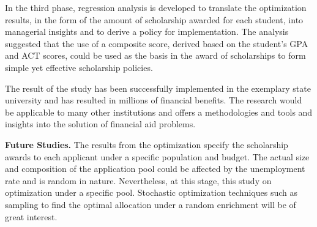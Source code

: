 \documentclass[12pt,english]{report}
\begin{document}
In the third phase, regression analysis is developed to translate the optimization results, in the form of the  amount of scholarship awarded for each student, into managerial insights and to derive a policy for implementation.  The analysis suggested that the use of a composite score, derived based on the student's GPA and ACT scores, could be used as the basis in the award of scholarships to form simple yet effective scholarship policies.

The result of the study has been successfully implemented in the exemplary state university and has resulted in millions of financial benefits.  The research would be applicable to many other institutions and offers a methodologies and tools and insights into the solution of financial aid problems. 

\noindent \textbf{Future Studies.}
The results from the optimization specify the scholarship awards to each applicant under a specific population and budget.  The actual size and composition of the application pool could be affected by the unemployment rate and is random in nature.  Nevertheless, at this stage, this study on optimization under a specific pool.  Stochastic optimization techniques such as sampling  to find the optimal allocation under a random enrichment will be of great interest. 

\end{document}
